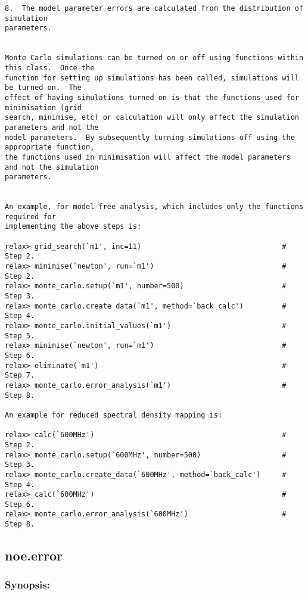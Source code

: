 {\begin{verbatim}
8.  The model parameter errors are calculated from the distribution of simulation
parameters.


Monte Carlo simulations can be turned on or off using functions within this class.  Once the
function for setting up simulations has been called, simulations will be turned on.  The
effect of having simulations turned on is that the functions used for minimisation (grid
search, minimise, etc) or calculation will only affect the simulation parameters and not the
model parameters.  By subsequently turning simulations off using the appropriate function,
the functions used in minimisation will affect the model parameters and not the simulation
parameters.


An example, for model-free analysis, which includes only the functions required for
implementing the above steps is:

relax> grid_search(`m1', inc=11)                                 # Step 2.
relax> minimise(`newton', run=`m1')                              # Step 2.
relax> monte_carlo.setup(`m1', number=500)                       # Step 3.
relax> monte_carlo.create_data(`m1', method=`back_calc')         # Step 4.
relax> monte_carlo.initial_values(`m1')                          # Step 5.
relax> minimise(`newton', run=`m1')                              # Step 6.
relax> eliminate(`m1')                                           # Step 7.
relax> monte_carlo.error_analysis(`m1')                          # Step 8.

An example for reduced spectral density mapping is:

relax> calc(`600MHz')                                            # Step 2.
relax> monte_carlo.setup(`600MHz', number=500)                   # Step 3.
relax> monte_carlo.create_data(`600MHz', method=`back_calc')     # Step 4.
relax> calc(`600MHz')                                            # Step 6.
relax> monte_carlo.error_analysis(`600MHz')                      # Step 8.
\end{verbatim}
}



\newpage

\subsection{noe.error}


\subsubsection{Synopsis:}

